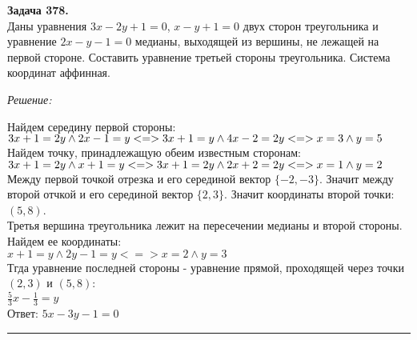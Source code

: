 \documentclass[a4paper, 12pt]{article}
\newenvironment{problem}[2][Задача]
    { \begin{mdframed}[backgroundcolor=gray!10] \textbf{#1 #2.} \\}
    {  \end{mdframed}}
\newenvironment{solution}
    {\textit{Решение: }}
    {\noindent\rule{7in}{1.5pt}}
\begin{document}
\begin{problem}{378}
Даны уравнения $3x-2y+1=0$, $x-y+1=0$ двух сторон треугольника и уравнение $2x-y-1=0$ медианы,
выходящей из вершины, не лежащей на первой стороне. Составить уравнение третьей стороны треугольника.
Система координат аффинная.
\end{problem}
\begin{solution}

Найдем середину первой стороны: \\
$3x+1=2y \land 2x-1=y <=> \\ 3x+1=y \land 4x-2=2y <=> \\ x = 3 \land y = 5$ \\
Найдем точку, принадлежащую обеим известным сторонам: \\
$3x+1=2y \land x+1=y <=> \\ 3x+1=2y \land 2x+2=2y <=> \\ x = 1 \land y = 2$ \\
Между первой точкой отрезка и его серединой вектор $\{-2, -3\}$.
Значит между второй отчкой и его серединой вектор $\{2, 3\}$.
Значит координаты второй точки: $(5, 8)$. \\
Третья вершина треугольника лежит на пересечении медианы и второй стороны. Найдем ее координаты: \\
$x+1=y \land 2y-1=y <=> x = 2 \land y = 3$ \\
Тгда уравнение последней стороны - уравнение прямой, проходящей через точки $(2, 3)$ и $(5, 8)$: \\
$\frac{5}{3}x-\frac{1}{3}=y$ \\
Ответ:
$5x-3y-1=0$

\end{solution}
\end{document}
